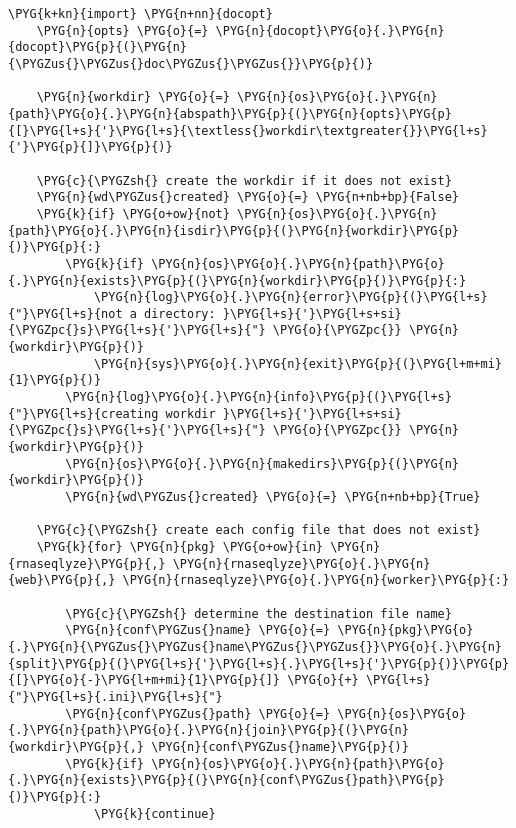 \begin{Verbatim}[commandchars=\\\{\}]
    \PYG{k+kn}{import} \PYG{n+nn}{docopt}
    \PYG{n}{opts} \PYG{o}{=} \PYG{n}{docopt}\PYG{o}{.}\PYG{n}{docopt}\PYG{p}{(}\PYG{n}{\PYGZus{}\PYGZus{}doc\PYGZus{}\PYGZus{}}\PYG{p}{)}

    \PYG{n}{workdir} \PYG{o}{=} \PYG{n}{os}\PYG{o}{.}\PYG{n}{path}\PYG{o}{.}\PYG{n}{abspath}\PYG{p}{(}\PYG{n}{opts}\PYG{p}{[}\PYG{l+s}{'}\PYG{l+s}{\textless{}workdir\textgreater{}}\PYG{l+s}{'}\PYG{p}{]}\PYG{p}{)}

    \PYG{c}{\PYGZsh{} create the workdir if it does not exist}
    \PYG{n}{wd\PYGZus{}created} \PYG{o}{=} \PYG{n+nb+bp}{False}
    \PYG{k}{if} \PYG{o+ow}{not} \PYG{n}{os}\PYG{o}{.}\PYG{n}{path}\PYG{o}{.}\PYG{n}{isdir}\PYG{p}{(}\PYG{n}{workdir}\PYG{p}{)}\PYG{p}{:}
        \PYG{k}{if} \PYG{n}{os}\PYG{o}{.}\PYG{n}{path}\PYG{o}{.}\PYG{n}{exists}\PYG{p}{(}\PYG{n}{workdir}\PYG{p}{)}\PYG{p}{:}
            \PYG{n}{log}\PYG{o}{.}\PYG{n}{error}\PYG{p}{(}\PYG{l+s}{"}\PYG{l+s}{not a directory: }\PYG{l+s}{'}\PYG{l+s+si}{\PYGZpc{}s}\PYG{l+s}{'}\PYG{l+s}{"} \PYG{o}{\PYGZpc{}} \PYG{n}{workdir}\PYG{p}{)}
            \PYG{n}{sys}\PYG{o}{.}\PYG{n}{exit}\PYG{p}{(}\PYG{l+m+mi}{1}\PYG{p}{)}
        \PYG{n}{log}\PYG{o}{.}\PYG{n}{info}\PYG{p}{(}\PYG{l+s}{"}\PYG{l+s}{creating workdir }\PYG{l+s}{'}\PYG{l+s+si}{\PYGZpc{}s}\PYG{l+s}{'}\PYG{l+s}{"} \PYG{o}{\PYGZpc{}} \PYG{n}{workdir}\PYG{p}{)}
        \PYG{n}{os}\PYG{o}{.}\PYG{n}{makedirs}\PYG{p}{(}\PYG{n}{workdir}\PYG{p}{)}
        \PYG{n}{wd\PYGZus{}created} \PYG{o}{=} \PYG{n+nb+bp}{True}

    \PYG{c}{\PYGZsh{} create each config file that does not exist}
    \PYG{k}{for} \PYG{n}{pkg} \PYG{o+ow}{in} \PYG{n}{rnaseqlyze}\PYG{p}{,} \PYG{n}{rnaseqlyze}\PYG{o}{.}\PYG{n}{web}\PYG{p}{,} \PYG{n}{rnaseqlyze}\PYG{o}{.}\PYG{n}{worker}\PYG{p}{:}

        \PYG{c}{\PYGZsh{} determine the destination file name}
        \PYG{n}{conf\PYGZus{}name} \PYG{o}{=} \PYG{n}{pkg}\PYG{o}{.}\PYG{n}{\PYGZus{}\PYGZus{}name\PYGZus{}\PYGZus{}}\PYG{o}{.}\PYG{n}{split}\PYG{p}{(}\PYG{l+s}{'}\PYG{l+s}{.}\PYG{l+s}{'}\PYG{p}{)}\PYG{p}{[}\PYG{o}{-}\PYG{l+m+mi}{1}\PYG{p}{]} \PYG{o}{+} \PYG{l+s}{"}\PYG{l+s}{.ini}\PYG{l+s}{"}
        \PYG{n}{conf\PYGZus{}path} \PYG{o}{=} \PYG{n}{os}\PYG{o}{.}\PYG{n}{path}\PYG{o}{.}\PYG{n}{join}\PYG{p}{(}\PYG{n}{workdir}\PYG{p}{,} \PYG{n}{conf\PYGZus{}name}\PYG{p}{)}
        \PYG{k}{if} \PYG{n}{os}\PYG{o}{.}\PYG{n}{path}\PYG{o}{.}\PYG{n}{exists}\PYG{p}{(}\PYG{n}{conf\PYGZus{}path}\PYG{p}{)}\PYG{p}{:}
            \PYG{k}{continue}


\end{Verbatim}
